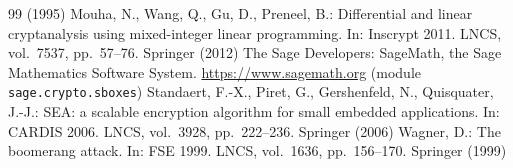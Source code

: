 \documentclass[runningheads]{llncs}
\begin{document}
\begin{thebibliography}{99}
  (1995)
 Mouha, N., Wang, Q., Gu, D., Preneel, B.: Differential and linear
  cryptanalysis using mixed-integer linear programming. In: Inscrypt 2011. LNCS,
  vol.\ 7537, pp.\ 57--76. Springer (2012)
 The Sage Developers: SageMath, the Sage Mathematics Software
  System. \url{https://www.sagemath.org} (module \texttt{sage.crypto.sboxes})
 Standaert, F.-X., Piret, G., Gershenfeld, N., Quisquater, J.-J.:
  SEA: a scalable encryption algorithm for small embedded applications. In:
  CARDIS 2006. LNCS, vol.\ 3928, pp.\ 222--236. Springer (2006)
 Wagner, D.: The boomerang attack. In: FSE 1999. LNCS, vol.\ 1636,
  pp.\ 156--170. Springer (1999)
\end{thebibliography}
\end{document}
